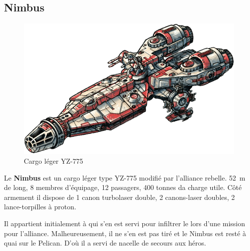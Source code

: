 \subsection{Nimbus} \label{sec:nimbus}
\vspace{-4\baselineskip}
\begin{figure}[h!]
    \centering
    \includegraphics[width=\linewidth]{_img/dos-au-muur/nimbus.png}
    \caption{Cargo léger YZ-775}
\end{figure}

Le \textbf{Nimbus} est un cargo léger type YZ-775 modifié par l’alliance rebelle. 52~m de long, 8 membres d’équipage, 12 passagers, 400 tonnes da charge utile. Côté armement il dispose de 1 canon turbolaser double, 2 canons-laser doubles, 2 lance-torpilles à proton.

Il appartient initialement à  qui s’en est servi pour infiltrer le  lors d’une mission pour l’alliance. Malheureusement, il ne s’en est pas tiré et le Nimbus est resté à quai sur le Pelican. D’où il a servi de nacelle de secours aux héros.
